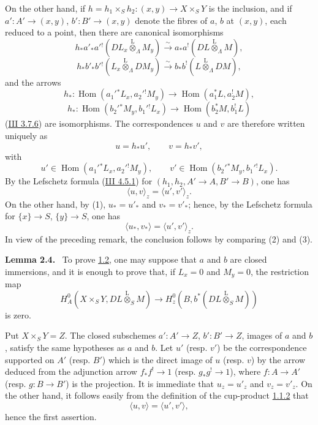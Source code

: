 \documentclass[11pt]{article}
\newenvironment{statement}[1]{\par\medskip\noindent\textbf{#1.}\ }{\par\medskip}
\DeclareMathOperator{\Hom}{Hom}
\providecommand{\lten}{\overset{\mathrm L}{\otimes}}
\providecommand{\Hom}{\operatorname{Hom}}
\providecommand{\lten}{\overset{\mathrm L}{\otimes}}
\providecommand{\lten}{\overset{\mathrm L}{\otimes}}
\providecommand{\lten}{\overset{\mathrm L}{\otimes}}
\providecommand{\lten}{\overset{\mathrm L}{\otimes}}
\providecommand{\lten}{\overset{\mathrm L}{\otimes}}
\providecommand{\Hom}{\operatorname{Hom}}
\providecommand{\lten}{\overset{\mathrm L}{\otimes}}
\begin{document}
On the other hand, if $h=h_1\times_Sh_2:(x,y)\to X\times_SY$ is the inclusion, and if $a':A'\to(x,y)$, $b':B'\to(x,y)$ denote the fibres of $a$, $b$ at $(x,y)$, each reduced to a point, then there are canonical isomorphisms
\[
h_*a'_*a'{}^!(DL_x\lten_{\Lambda}M_y)
 \xrightarrow{\sim} a_*a^!(DL\lten_{\Lambda}M),
\]
\[
h_*b'_*b'{}^!(L_x\lten_{\Lambda}DM_y)
 \xrightarrow{\sim} b_*b^!(L\lten_{\Lambda}DM),
\]
and the arrows
\[
h_*:\Hom(a_1'{}^*L_x,a_2'{}^!M_y)\to \Hom(a_1^*L,a_2^!M),
\]
\[
h_*:\Hom(b_2'{}^*M_y,b_1'{}^!L_x)\to \Hom(b_2^*M,b_1^!L)
\]
(\hyperref[sga5:III:equation:3.7.6]{III 3.7.6}) are isomorphisms. The correspondences $u$ and $v$ are therefore written uniquely as
\begin{equation}\tag{1}\label{sga5:IIIB:equation:1}
u=h_*u',\qquad v=h_*v',
\end{equation}
with
\[
u'\in\Hom(a_1'{}^*L_x,a_2'{}^!M_y),\qquad
v'\in\Hom(b_2'{}^*M_y,b_1'{}^!L_x).
\]
By the Lefschetz formula (\hyperref[sga5:III:equation:4.5.1]{III 4.5.1}) for $(h_1,h_2,A'\to A,B'\to B)$, one has
\begin{equation}\tag{2}\label{sga5:IIIB:equation:2}
\langle u,v\rangle_z=\langle u',v'\rangle_z .
\end{equation}
On the other hand, by (1), $u_*=u'_*$ and $v_*=v'_*$; hence, by the Lefschetz formula for $\{x\}\to S$, $\{y\}\to S$, one has
\begin{equation}\tag{3}\label{sga5:IIIB:equation:3}
\langle u_*,v_*\rangle=\langle u',v'\rangle_z .
\end{equation}
In view of the preceding remark, the conclusion follows by comparing (2) and (3).

\label{sga5:IIIB:lemma:2.4}\begin{statement}{Lemma 2.4}
To prove \hyperref[sga5:IIIB:theorem:1.2]{1.2}, one may suppose that $a$ and $b$ are closed immersions, and it is enough to prove that, if $L_x=0$ and $M_y=0$, the restriction map
\begin{equation}
H_A^0(X\times_SY,DL\lten_SM)
 \longrightarrow H_z^0(B,b^*(DL\lten_SM))
\tag{2.4.1}\label{sga5:IIIB:equation:2.4.1}
\end{equation}
is zero.
\end{statement}

Put $X\times_SY=Z$. The closed subschemes $a':A'\to Z$, $b':B'\to Z$, images of $a$ and $b$, satisfy the same hypotheses as $a$ and $b$. Let $u'$ (resp. $v'$) be the correspondence supported on $A'$ (resp. $B'$) which is the direct image of $u$ (resp. $v$) by the arrow deduced from the adjunction arrow $f_*f^!\to1$ (resp. $g_*g^!\to1$), where $f:A\to A'$ (resp. $g:B\to B'$) is the projection. It is immediate that $u_z=u'_z$ and $v_z=v'_z$. On the other hand, it follows easily from the definition of the cup-product \hyperref[sga5:IIIB:equation:1.1.2]{1.1.2} that
\[
\langle u,v\rangle=\langle u',v'\rangle,
\]
hence the first assertion.
\end{document}
